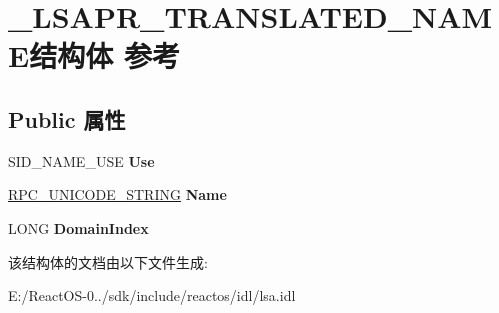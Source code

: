 \hypertarget{struct___l_s_a_p_r___t_r_a_n_s_l_a_t_e_d___n_a_m_e}{}\section{\+\_\+\+L\+S\+A\+P\+R\+\_\+\+T\+R\+A\+N\+S\+L\+A\+T\+E\+D\+\_\+\+N\+A\+M\+E结构体 参考}
\label{struct___l_s_a_p_r___t_r_a_n_s_l_a_t_e_d___n_a_m_e}
\subsection*{Public 属性}
\begin{DoxyCompactItemize}
\item 
\mbox{\label{struct___l_s_a_p_r___t_r_a_n_s_l_a_t_e_d___n_a_m_e_adcd3c15b7b5aa46f0fd1ba8d1db3b3dc}} 
S\+I\+D\+\_\+\+N\+A\+M\+E\+\_\+\+U\+SE {\bfseries Use}
\item 
\mbox{\label{struct___l_s_a_p_r___t_r_a_n_s_l_a_t_e_d___n_a_m_e_ae4375a757505ca1e9f92eb5c97809f86}} 
\hyperlink{struct___r_p_c___u_n_i_c_o_d_e___s_t_r_i_n_g}{R\+P\+C\+\_\+\+U\+N\+I\+C\+O\+D\+E\+\_\+\+S\+T\+R\+I\+NG} {\bfseries Name}
\item 
\mbox{\label{struct___l_s_a_p_r___t_r_a_n_s_l_a_t_e_d___n_a_m_e_af2dc042cada0e936c478164ef90ea647}} 
L\+O\+NG {\bfseries Domain\+Index}
\end{DoxyCompactItemize}


该结构体的文档由以下文件生成\+:\begin{DoxyCompactItemize}
\item 
E\+:/\+React\+O\+S-\/0../sdk/include/reactos/idl/lsa.\+idl\end{DoxyCompactItemize}
